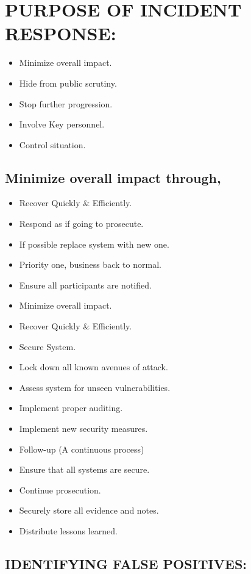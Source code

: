 \documentclass[10pt,british,english]{article}
\begin{document}
\section{PURPOSE OF INCIDENT RESPONSE:}
\begin{itemize}
\item Minimize overall impact.
\item Hide from public scrutiny.
\item Stop further progression.
\item Involve Key personnel.
\item Control situation.
\end{itemize}
%

\subsection{Minimize overall impact through,}
\begin{itemize}
\item Recover Quickly \& Efficiently.
\item Respond as if going to prosecute.
\item If possible replace system with new one.
\item Priority one, business back to normal.
\item Ensure all participants are notified.
\item Minimize overall impact.
\item Recover Quickly \& Efficiently.
\item Secure System.
\item Lock down all known avenues of attack.
\item Assess system for unseen vulnerabilities.
\item Implement proper auditing.
\item Implement new security measures. 
\item Follow-up (A continuous process)
\item Ensure that all systems are secure.
\item Continue prosecution.
\item Securely store all evidence and notes.
\item Distribute lessons learned.
\end{itemize}

\subsection{IDENTIFYING FALSE POSITIVES:}
\end{document}
